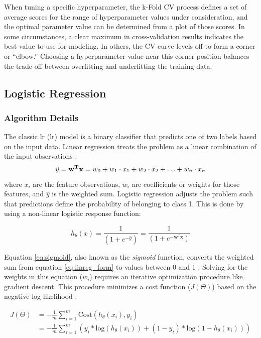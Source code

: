 When tuning a specific hyperparameter, the k-Fold CV process defines a set of average scores for the range of hyperparameter values under consideration, and the optimal parameter value can be determined from a plot of those scores. In some circumstances, a clear maximum in cross-validation results indicates the best value to use for modeling. In others, the CV curve levels off to form a corner or ``elbow.'' Choosing a hyperparameter value near this corner position balances the trade-off between overfitting and underfitting the training data.

\subsection{Logistic Regression}\label{ch3:logistic_regression}
\subsubsection{Algorithm Details} \label{ch3:lr_details}
The classic \acrlong{lr} (\acrshort{lr}) model is a binary classifier that predicts one of two labels based on the input data. Linear regression treats the problem as a linear combination of the input observations \citep[p.\ 369]{bertsimas_analytics_2016}:
\begin{equation}
\label{eq:linreg_form}
    \hat{y} = {\bf{w^Tx}} = w_0 + w_1 \cdot x_1 + w_2 \cdot x_2 + \ldots + w_n \cdot x_n 
\end{equation}
where $x_i$ are the feature observations, $w_i$ are coefficients or weights for those features, and $\hat{y}$ is the weighted sum. Logistic regression adjusts the problem such that predictions define the probability of belonging to class 1. This is done by using a non-linear logistic response function: 

\begin{equation}
\label{eq:sigmoid}
h_{\theta}(x) = \frac{1}{(1+e^{-\hat{y}})} = \frac{1}{(1+e^{-\textbf{w}^T\textbf{x}})}
\end{equation}

Equation \ref{eq:sigmoid}, also known as the \textit{sigmoid} function, converts the weighted sum from equation \ref{eq:linreg_form} to values between 0 and 1 \citep[p.\ 369]{bertsimas_analytics_2016}. Solving for the weights in this equation ($w_i$) requires an iterative optimization procedure like gradient descent. This procedure minimizes a cost function ($J(\Theta)$) based on the negative log likelihood \citep{ng_logistic_2011}:

\begin{equation}
\label{eq:logreg_cost}
\begin{aligned}
        J(\Theta) &= -\frac{1}{m} \sum_{i=1}^{m}{\text{Cost}(h_{\theta}(x_i),y_i)} \\ &= -\frac{1}{m}\sum_{i=1}^{m}{(y_i*\text{log}({h_{\theta}(x_i)})+(1-y_i)*\text{log}(1-h_{\theta}(x_i)))}
\end{aligned}
\end{equation}

